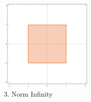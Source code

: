 \documentclass[a4paper]{article}
\theoremstyle{definition}
\newenvironment{soln}{
    \leavevmode\color{blue}\ignorespaces
}{}
\begin{document}
\begin{enumerate}
\begin{soln}
		\begin{figure}[h!]
	        \centering
	        \includegraphics[width=0.4\textwidth]{NormInfinity.png} 
	        \captionsetup{labelformat=empty}
	        \caption{3. Norm Infinity}
	        \label{fig:Norm Infinity}
	        \end{figure}

	\end{soln}

\end{enumerate}
\end{document}
